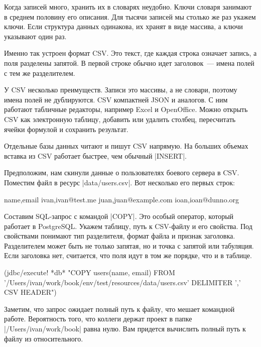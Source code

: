 Когда записей много, хранить их в словарях неудобно. Ключи словаря занимают в
среднем половину его описания. Для тысячи записей мы столько же раз укажем
ключи. Если структура данных одинакова, их хранят в виде массива, а ключи
указывают один раз.

Именно так устроен формат
CSV. Это текст,
где каждая строка означает запись, а поля разделены запятой. В первой строке
обычно идет заголовок~--- имена полей с тем же разделителем.

У CSV несколько преимуществ. Записи это массивы, а не словари, поэтому имена
полей не дублируются. CSV компактней JSON и аналогов. С ним работают табличные
редакторы, например Excel и OpenOffice. Можно открыть CSV как электронную
таблицу, добавить или удалить столбец, пересчитать ячейки формулой и сохранить
результат.

Отдельные базы данных читают и пишут CSV напрямую. На больших объемах вставка из
CSV работает быстрее, чем обычный \spverb|INSERT|.

Предположим, нам скинули данные о пользователях боевого сервера в CSV. Поместим
файл в ресурс \spverb|data/users.csv|. Вот несколько его первых строк:

\begin{english}
  \begin{text}
name,email
ivan,ivan@test.me
juan,juan@example.com
ioan,ioan@dunno.org
  \end{text}
\end{english}

Составим SQL-запрос с командой \spverb|COPY|. Это особый оператор, который
работает в PostgreSQL. Укажем таблицу, путь к CSV-файлу и его свойства. Под
свойствами понимают тип разделителя, формат файла и признак
заголовка. Разделителем может быть не только запятая, но и точка с запятой или
табуляция. Если заголовка нет, считается, что поля идут в том же порядке, что и
в таблице.

\begin{english}
  \begin{clojure}
(jdbc/execute! *db*
 "COPY users(name, email)
  FROM '/Users/ivan/work/book/env/test/resources/data/users.csv'
  DELIMITER ',' CSV HEADER")
  \end{clojure}
\end{english}

Заметим, что запрос ожидает полный путь к файлу, что мешает командной
работе. Вероятность того, что коллеги держат проект в папке
\spverb|/Users/ivan/work/book| равна нулю. Вам придется вычислить полный путь к
файлу из относительного.


